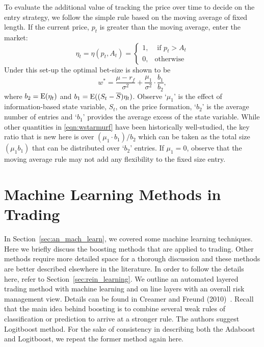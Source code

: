 To evaluate the additional value of tracking the price over time to decide on the entry strategy, we follow the simple rule based on the moving average of fixed length. If the current price, $p_t$ is greater than the moving average, enter the market:
	\begin{equation} \label{eqn:etatetapt}
	\eta_t= \eta(p_t,A_t)= \begin{cases}
	1, & \text{ if } p_t > A_t \\
	0, & \text{otherwise}
	\end{cases}
	\end{equation}
Under this set-up the optimal bet-size is shown to be
	\begin{equation} \label{eqn:wstarmurf}
	w^*= \dfrac{\mu - r_f}{\sigma^2} + \dfrac{\mu_1}{\sigma^2} \cdot \dfrac{b_1}{b_2},
	\end{equation}
where $b_2= \operatorname{E}(\eta_t)$ and $b_1= \operatorname{E}((S_t - \overline{S}) \eta_t)$. Observe `$\mu_1$' is the effect of information-based state variable, $S_t$, on the price formation, `$b_2$' is the average number of entries and `$b_1$' provides the average excess of the state variable. While other quantities in \eqref{eqn:wstarmurf} have been historically well-studied, the key ratio that is new here is over $(\mu_1 \cdot b_1)/b_2$ which can be taken as the total size $(\mu_1 b_1)$ that can be distributed over `$b_2$' entries. If $\mu_1= 0$, observe that the moving average rule may not add any flexibility to the fixed size entry. 



\section{Machine Learning Methods in Trading}

In Section~\ref{sec:an_mach_learn},\label{in:boost2} we covered some machine learning techniques. Here we briefly discuss the boosting methods that are applied to trading. Other methods require more detailed space for a thorough discussion and these methods are better described elsewhere in the literature. In order to follow the details here, refer to Section~\ref{sec:rein_learning}. We outline an automated layered trading method with machine learning and on line layers with an overall risk management view.\label{in:machine2} Details can be found in Creamer and Freund (2010)~\cite{creamer2010}. Recall that the main idea behind boosting is to combine several weak rules of classification or prediction to arrive at a stronger rule. The authors suggest Logitboost method. For the sake of consistency in describing both the Adaboost and Logitboost, we repeat the former method  again here. 


